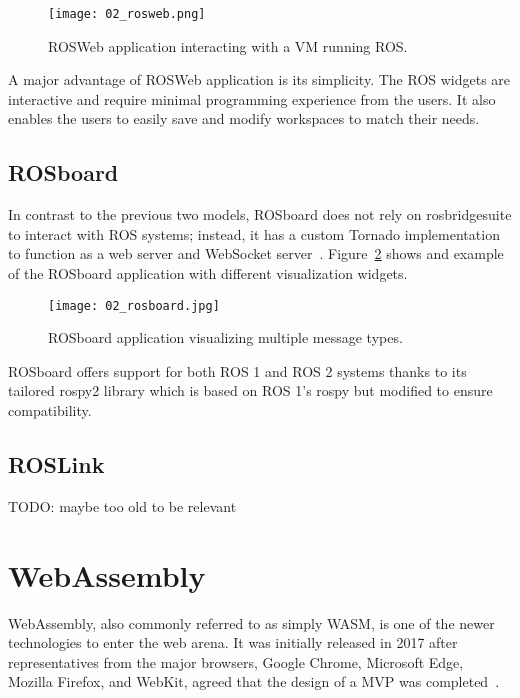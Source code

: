         \begin{figure}[htbp]
            \centering
            \texttt{[image: 02\_rosweb.png]}
            \caption{ROSWeb application interacting with a \ac{VM} running \ac{ROS}.}
            \label{fig:rosweb}
        \end{figure}

        A major advantage of ROSWeb application is its simplicity. The \ac{ROS} widgets are interactive and require minimal programming experience from the users. It also enables the users to easily save and modify workspaces to match their needs.

    \subsection{ROSboard}

        In contrast to the previous two models, ROSboard does not rely on \textsf{rosbridge\smallunderscore suite} to interact with \ac{ROS} systems; instead, it has a custom \textsf{Tornado} implementation to function as a web server and WebSocket server~\cite{rosboard}. Figure~\ref{fig:rosboard} shows and example of the ROSboard application with different visualization widgets.

        \begin{figure}[htbp]
            \centering
            \texttt{[image: 02\_rosboard.jpg]}
            \caption{ROSboard application visualizing multiple message types.}
            \label{fig:rosboard}
        \end{figure}

        ROSboard offers support for both \ac{ROS} 1 and \ac{ROS} 2 systems thanks to its tailored \textsf{rospy2} library which is based on \ac{ROS} 1's \textsf{rospy} but modified to ensure compatibility.

    \subsection{ROSLink}

    TODO: maybe too old to be relevant

    \pagebreak

\section{WebAssembly}

    WebAssembly, also commonly referred to as simply WASM, is one of the newer technologies to enter the web arena. It was initially released in 2017 after representatives from the major browsers, Google Chrome, Microsoft Edge, Mozilla Firefox, and WebKit, agreed that the design of a \ac{MVP} was completed~\cite{krill}.

